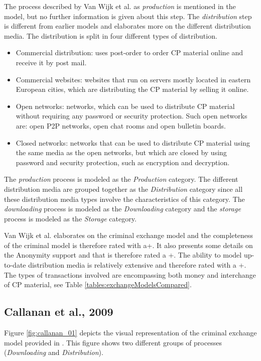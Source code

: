 \documentclass{sig-alternate-br}
\begin{document}
The process described by Van Wijk et al. as \textit{production} is mentioned in the model, but no further information is given about this step. The \textit{distribution} step is different from earlier models and elaborates more on the different distribution media. The distribution is split in four different types of distribution.
\begin{itemize}
	\item Commercial distribution: uses post-order to order CP material online and receive it by post mail. 
	\item Commercial websites: websites that run on servers mostly located in eastern European cities, which are distributing the CP material by selling it online.
	\item Open networks: networks, which can be used to distribute CP material without requiring any password or security protection. Such open networks are: open P2P networks, open chat rooms and open bulletin boards.
	\item Closed networks: networks that can be used to distribute CP material using the same media as the open networks, but which are closed by using password and security protection, such as encryption and decryption.
\end{itemize}

The \textit{production} process is modeled as the \textit{Production} category. The different distribution media are grouped together as the \textit{Distribution} category since all these distribution media types involve the characteristics of this category. The \textit{downloading} process is modeled as the \textit{Downloading} category and the \textit{storage} process is modeled as the \textit{Storage} category.

Van Wijk et al. elaborates on the criminal exchange model and the completeness of the criminal model is therefore rated with a+. It also presents some details on the Anonymity support and that is therefore rated a +. The ability to model up-to-date distribution media is relatively extensive and therefore rated with a +. The types of transactions involved are encompassing both money and interchange of CP material, see Table \ref{tables:exchangeModelsCompared}.

\subsection{Callanan et al., 2009 \cite{callanan2009internet}}
Figure \ref{fig:callanan_01} depicts the visual representation of the criminal exchange model provided in \cite{callanan2009internet}. This figure shows two different groups of processes (\textit{Downloading} and \textit{Distribution}).
\end{document}
